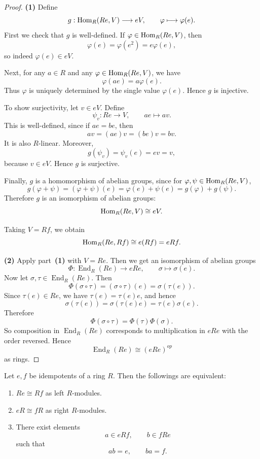 \begin{proof}
    \textbf{(1)} Define
    \[
        g:\mathrm{Hom}_R(Re,V)\longrightarrow eV,\qquad \varphi\longmapsto \varphi(e).
    \]
    First we check that $g$ is well-defined. If $\varphi\in \mathrm{Hom}_R(Re,V)$, then
    \[
        \varphi(e)=\varphi(e^2)=e\varphi(e),
    \]
    so indeed $\varphi(e)\in eV$.

    Next, for any $a\in R$ and any $\varphi\in \mathrm{Hom}_R(Re,V)$, we have
    \[
        \varphi(ae)=a\varphi(e).
    \]
    Thus $\varphi$ is uniquely determined by the single value $\varphi(e)$. Hence $g$ is injective.

    To show surjectivity, let $v\in eV$. Define
    \[
        \psi_v:Re\longrightarrow V,\qquad ae\longmapsto av.
    \]
    This is well-defined, since if $ae=be$, then
    \[
        av=(ae)v=(be)v=bv.
    \]
    It is also $R$-linear. Moreover,
    \[
        g(\psi_v)=\psi_v(e)=ev=v,
    \]
    because $v\in eV$. Hence $g$ is surjective.

    Finally, $g$ is a homomorphism of abelian groups, since for $\varphi,\psi\in \mathrm{Hom}_R(Re,V)$,
    \[
        g(\varphi+\psi)=(\varphi+\psi)(e)=\varphi(e)+\psi(e)=g(\varphi)+g(\psi).
    \]
    Therefore $g$ is an isomorphism of abelian groups:
    \[
        \mathrm{Hom}_R(Re,V)\cong eV.
    \]

    Taking $V=Rf$, we obtain
    \[
        \mathrm{Hom}_R(Re,Rf)\cong e(Rf)=eRf.
    \]

    \medskip

    \textbf{(2)} Apply part~\textbf{(1)} with $V=Re$. Then we get an isomorphism of abelian groups
    \[
        \Phi:\operatorname{End}_R(Re)\longrightarrow eRe,\qquad \sigma\longmapsto \sigma(e).
    \]
    Now let $\sigma,\tau\in \operatorname{End}_R(Re)$. Then
    \[
        \Phi(\sigma\circ\tau)
        =(\sigma\circ\tau)(e)
        =\sigma(\tau(e)).
    \]
    Since $\tau(e)\in Re$, we have $\tau(e)=\tau(e)e$, and hence
    \[
        \sigma(\tau(e))
        =\sigma(\tau(e)e)
        =\tau(e)\sigma(e).
    \]
    Therefore
    \[
        \Phi(\sigma\circ\tau)=\Phi(\tau)\Phi(\sigma).
    \]
    So composition in $\operatorname{End}_R(Re)$ corresponds to multiplication in $eRe$ with the order reversed. Hence
    \[
        \operatorname{End}_R(Re)\cong (eRe)^{op}
    \]
    as rings.
\end{proof}

\begin{theorem}
    Let $e,f$ be idempotents of a ring $R$. Then the followings are equivalent:
    \begin{enumerate}
        \item $Re \cong Rf$ as left $R$-modules.
        \item $eR \cong fR$ as right $R$-modules.
        \item There exist elements
              \[
                  a \in eRf, \qquad b \in fRe
              \]
              such that
              \[
                  ab=e, \qquad ba=f.
              \]
    \end{enumerate}
\end{theorem}

